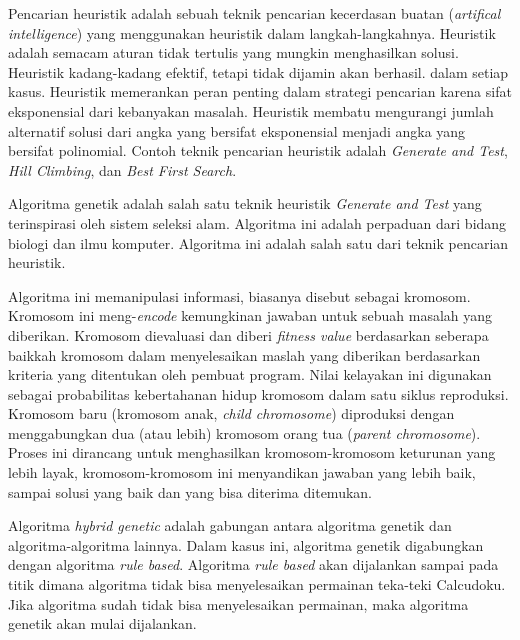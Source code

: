 Pencarian heuristik adalah sebuah teknik pencarian kecerdasan buatan (\textit{artifical intelligence}) yang menggunakan heuristik dalam langkah-langkahnya. Heuristik adalah semacam aturan tidak tertulis yang mungkin menghasilkan solusi. Heuristik kadang-kadang efektif, tetapi tidak dijamin akan berhasil. dalam setiap kasus. Heuristik memerankan peran penting dalam strategi pencarian karena sifat eksponensial dari kebanyakan masalah. Heuristik membatu mengurangi jumlah alternatif solusi dari angka yang bersifat eksponensial menjadi angka yang bersifat polinomial. Contoh teknik pencarian heuristik adalah \textit{Generate and Test}, \textit{Hill Climbing}, dan \textit{Best First Search}.

Algoritma genetik adalah salah satu teknik heuristik \textit{Generate and Test} yang terinspirasi oleh sistem seleksi alam. Algoritma ini adalah perpaduan dari bidang biologi dan ilmu komputer. Algoritma ini adalah salah satu dari teknik pencarian heuristik.

Algoritma ini memanipulasi informasi, biasanya disebut sebagai kromosom. Kromosom ini meng-\textit{encode} kemungkinan jawaban untuk sebuah masalah yang diberikan. Kromosom dievaluasi dan diberi \textit{fitness value} berdasarkan seberapa baikkah kromosom dalam menyelesaikan maslah yang diberikan berdasarkan kriteria yang ditentukan oleh pembuat program. Nilai kelayakan ini digunakan sebagai probabilitas kebertahanan hidup kromosom dalam satu siklus reproduksi. Kromosom baru (kromosom anak, \textit{child chromosome}) diproduksi dengan menggabungkan dua (atau lebih) kromosom orang tua (\textit{parent chromosome}). Proses ini dirancang untuk menghasilkan kromosom-kromosom keturunan yang lebih layak, kromosom-kromosom ini menyandikan jawaban yang lebih baik, sampai solusi yang baik dan yang bisa diterima ditemukan.

Algoritma \textit{hybrid genetic} adalah gabungan antara algoritma genetik dan algoritma-algoritma lainnya. Dalam kasus ini, algoritma genetik digabungkan dengan algoritma \textit{rule based}. Algoritma \textit{rule based} akan dijalankan sampai pada titik dimana algoritma tidak bisa menyelesaikan permainan teka-teki Calcudoku. Jika algoritma sudah tidak bisa menyelesaikan permainan, maka algoritma genetik akan mulai dijalankan.  ~\cite{johanna:12:hybrid}

